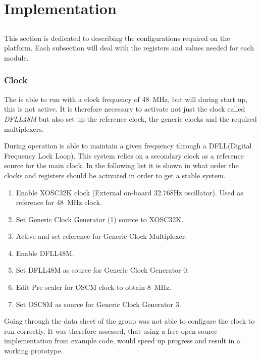 
\chapter{Implementation}
\section{\SAMD}
This section is dedicated to describing the configurations required on the \SAMD platform. Each subsection will deal with the registers and values needed for each module.
\subsection{Clock}
The \SAMD is able to run with a clock frequency of \SI{48}{\mega\hertz}, but will during start up, this is not active. It is therefore necessary to activate not just the clock called \textit{DFLL48M} but also set up the reference clock, the generic clocks and the required multiplexers.

During operation \SAMD is able to maintain a given frequency through a DFLL(Digital Frequency Lock Loop).
This system relies on a secondary clock as a reference source for the main clock.
In the following list it is shown in what order the clocks and registers should be activated in order to get a stable system.

\begin{enumerate}
	\item Enable XOSC32K clock (External on-board 32.768Hz oscillator). Used as reference for \SI{48}{\mega\hertz} clock.
	\item Set Generic Clock Generator (1) source to XOSC32K.
	\item Active and set reference for Generic Clock Multiplexer.
	\item Enable DFLL48M.
	\item Set DFLL48M as source for Generic Clock Generator 0.
	\item Edit Pre scaler for OSCM clock to obtain \SI{8}{\mega\hertz}.
	\item Set OSC8M as source for Generic Clock Generator 3.
\end{enumerate} 

Going through the data sheet of \SAMD the group was not able to configure the clock to run correctly. It was therefore assessed, that using a free open source implementation from example code, would speed up progress and result in a working prototype.

